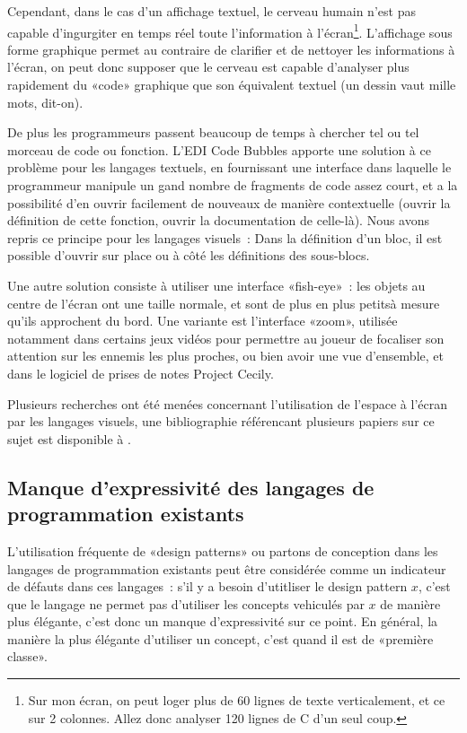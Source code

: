 \documentclass{article}
\begin{document}
Cependant, dans le cas d'un affichage textuel, le cerveau humain n'est pas capable d'ingurgiter en temps réel toute l'information à
l'écran\footnote{Sur mon écran, on peut loger plus de 60 lignes de texte verticalement, et ce sur 2 colonnes. Allez donc analyser 120 lignes
  de C d'un seul coup.}. L'affichage sous forme graphique permet au contraire de clarifier et de nettoyer les informations à l'écran, on
peut donc supposer que le cerveau est capable d'analyser plus rapidement du «code» graphique que son équivalent textuel (un dessin vaut
mille mots, dit-on).

De plus les programmeurs passent beaucoup de temps à chercher tel ou tel morceau de code ou fonction. L'EDI Code Bubbles\cite{code-bubbles}
apporte une solution à ce problème pour les langages textuels, en fournissant une interface dans laquelle le programmeur manipule un gand
nombre de fragments de code assez court, et a la possibilité d'en ouvrir facilement de nouveaux de manière contextuelle (ouvrir la
définition de cette fonction, ouvrir la documentation de celle-là). Nous avons repris ce principe pour les langages visuels~: Dans la
définition d'un bloc, il est possible d'ouvrir sur place ou à côté les définitions des sous-blocs.

Une autre solution consiste à utiliser une interface «fish-eye»~: les objets au centre de l'écran ont une taille normale, et sont de plus en
plus petitsà mesure qu'ils approchent du bord. Une variante est l'interface «zoom», utilisée notamment dans certains jeux
vidéos\cite{mutant-storm} pour permettre au joueur de focaliser son attention sur les ennemis les plus proches, ou bien avoir une vue
d'ensemble, et dans le logiciel de prises de notes Project Cecily\cite{project-cecily}.

Plusieurs recherches ont été menées concernant l'utilisation de l'espace à l'écran par les langages visuels, une bibliographie référencant
plusieurs papiers sur ce sujet est disponible à \cite{biblio-vpl-a-screen-real-estate}.


\subsection[Manque d'expressivité]{Manque d'expressivité des langages de programmation existants}

L'utilisation fréquente de «design patterns» ou partons de conception dans les langages de programmation existants peut être considérée
comme un indicateur de défauts dans ces langages\cite{design-patterns-failure}~: s'il y a besoin d'utitliser le design pattern $x$, c'est
que le langage ne permet pas d'utiliser les concepts vehiculés par $x$ de manière plus élégante, c'est donc un manque d'expressivité sur ce
point. En général, la manière la plus élégante d'utiliser un concept, c'est quand il est de «première classe».
\end{document}

